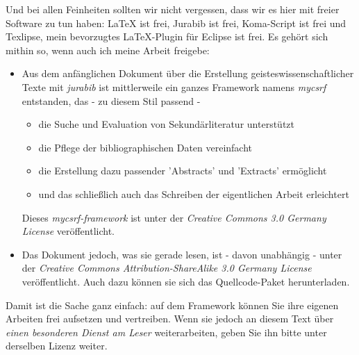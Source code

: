 Und bei allen Feinheiten sollten wir nicht vergessen, dass wir es hier mit
freier Software zu tun haben: LaTeX ist frei, Jurabib ist frei, Koma-Script ist
frei und Texlipse, mein bevorzugtes LaTeX-Plugin für Eclipse ist frei. Es gehört
sich mithin so, wenn auch ich meine Arbeit freigebe: 

\begin{itemize}
  \item Aus dem anfänglichen Dokument über die Erstellung
  geisteswissenschaftlicher Texte mit \textit{jurabib} ist mittlerweile ein
  ganzes Framework namens \textit{mycsrf} entstanden, das - zu diesem Stil
  passend -
  \begin{itemize}
    \item die Suche und Evaluation von Sekundärliteratur unterstützt
    \item die Pflege der bibliographischen Daten vereinfacht
    \item die Erstellung dazu passender 'Abstracts' und 'Extracts' ermöglicht
    \item und das schließlich auch das Schreiben der eigentlichen Arbeit
    erleichtert
  \end{itemize}
  Dieses \textit{mycsrf-framework} ist unter der \textit{Creative Commons
  3.0 Germany License} veröffentlicht.
  \item Das Dokument jedoch, was sie gerade lesen, ist - davon unabhängig -
  unter der \textit{Creative Commons Attribution-ShareAlike 3.0 Germany License}
  veröffentlicht. Auch dazu können sie sich das Quellcode-Paket
  herunterladen.
\end{itemize}

Damit ist die Sache ganz einfach: auf dem Framework können Sie ihre eigenen
Arbeiten frei aufsetzen und vertreiben. Wenn sie jedoch an diesem Text über
\textit{einen besonderen Dienst am Leser} weiterarbeiten, geben Sie ihn bitte
unter derselben Lizenz weiter.


